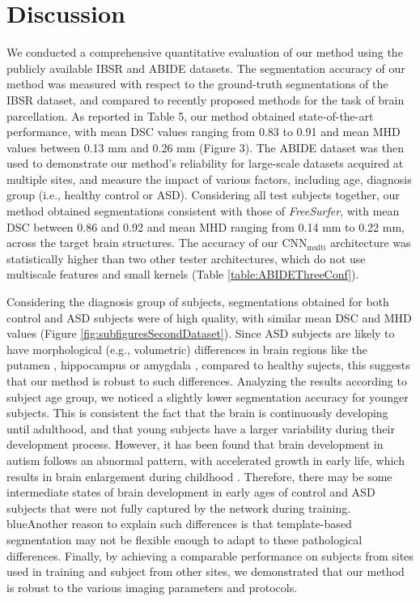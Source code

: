 \documentclass[twoside,fleqn,espcrc2]{elsarticle}
\newcommand{\CNNmulti}{\mr{CNN}_\mr{multi}}
\newcommand{\mr}[1]{\mathrm{#1}}
\newcommand{\FreeSurfer}{\textit{FreeSurfer}}
\begin{document}
\section{Discussion}
\label{sec:discussion}


We conducted a comprehensive quantitative evaluation of our method using the publicly available IBSR and ABIDE datasets. The segmentation accuracy of our method was measured with respect to the ground-truth segmentations of the IBSR dataset, and compared to recently proposed methods for the task of brain parcellation. As reported in Table 5, our method obtained state-of-the-art performance, with mean DSC values ranging from 0.83 to 0.91 and mean MHD values between 0.13 mm and 0.26 mm (Figure 3). The ABIDE dataset was then used to demonstrate our method's reliability for large-scale datasets acquired at multiple sites, and measure the impact of various factors, including age, diagnosis group (i.e., healthy control or ASD). Considering all test subjects together, our method obtained segmentations consistent with those of \FreeSurfer{}, with mean DSC between 0.86 and 0.92 and mean MHD ranging from 0.14 mm to 0.22 mm, across the target brain structures. The accuracy of our $\CNNmulti$ architecture was statistically higher than two other tester architectures, which do not use multiscale features and small kernels (Table \ref{table:ABIDEThreeConf}). 



Considering the diagnosis group of subjects, segmentations obtained for both control and ASD subjects were of high quality, with similar mean DSC and MHD values (Figure \ref{fig:subfiguresSecondDataset}). Since ASD subjects are likely to have morphological (e.g., volumetric) differences in brain regions like the putamen \cite{sato2013increased}, hippocampus \cite{nicolson2006detection} or amygdala \cite{schumann2004amygdala}, compared to healthy sujects, this suggests that our method is robust to such differences. Analyzing the results according to subject age group, we noticed a slightly lower segmentation accuracy for younger subjects. This is consistent the fact that the brain is continuously developing until adulthood, and that young subjects have a larger variability during their development process. However, it has been found that brain development in autism follows an abnormal pattern, with accelerated growth in early life, which results in brain enlargement during childhood \cite{aylward2002effects}. Therefore, there may be some intermediate states of brain development in early ages of control and ASD subjects that were not fully captured by the network during training. {blue}{Another reason to explain such differences is that template-based segmentation may not be flexible enough to adapt to these pathological differences.} 
Finally, by achieving a comparable performance on subjects from sites used in training and subject from other sites, we demonstrated that our method is robust to the various imaging parameters and protocols.
\end{document}
